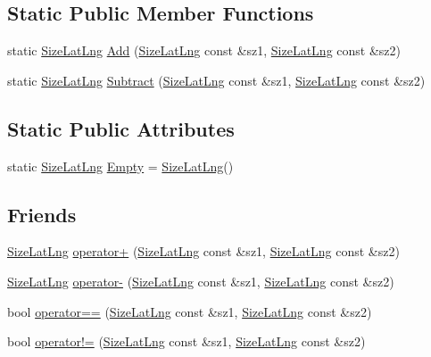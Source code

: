 \subsection*{\-Static \-Public \-Member \-Functions}
\begin{DoxyCompactItemize}
\item 
static \hyperlink{structinternals_1_1_size_lat_lng}{\-Size\-Lat\-Lng} \hyperlink{group___o_p_map_widget_gab3c5d8301e62629897221a2d5b2ba0b7}{\-Add} (\hyperlink{structinternals_1_1_size_lat_lng}{\-Size\-Lat\-Lng} const \&sz1, \hyperlink{structinternals_1_1_size_lat_lng}{\-Size\-Lat\-Lng} const \&sz2)
\item 
static \hyperlink{structinternals_1_1_size_lat_lng}{\-Size\-Lat\-Lng} \hyperlink{group___o_p_map_widget_ga6e437e3b3d5fd023b4afec09ad37928e}{\-Subtract} (\hyperlink{structinternals_1_1_size_lat_lng}{\-Size\-Lat\-Lng} const \&sz1, \hyperlink{structinternals_1_1_size_lat_lng}{\-Size\-Lat\-Lng} const \&sz2)
\end{DoxyCompactItemize}
\subsection*{\-Static \-Public \-Attributes}
\begin{DoxyCompactItemize}
\item 
static \hyperlink{structinternals_1_1_size_lat_lng}{\-Size\-Lat\-Lng} \hyperlink{group___o_p_map_widget_gad305f7cf650e7a5490bb77ccc65bbe08}{\-Empty} = \hyperlink{structinternals_1_1_size_lat_lng}{\-Size\-Lat\-Lng}()
\end{DoxyCompactItemize}
\subsection*{\-Friends}
\begin{DoxyCompactItemize}
\item 
\hyperlink{structinternals_1_1_size_lat_lng}{\-Size\-Lat\-Lng} \hyperlink{group___o_p_map_widget_ga398e0bae9b1c31e141e49ea14f960ad3}{operator+} (\hyperlink{structinternals_1_1_size_lat_lng}{\-Size\-Lat\-Lng} const \&sz1, \hyperlink{structinternals_1_1_size_lat_lng}{\-Size\-Lat\-Lng} const \&sz2)
\item 
\hyperlink{structinternals_1_1_size_lat_lng}{\-Size\-Lat\-Lng} \hyperlink{group___o_p_map_widget_ga5d0f63cfc6ce4e2c3249697e3156df5e}{operator-\/} (\hyperlink{structinternals_1_1_size_lat_lng}{\-Size\-Lat\-Lng} const \&sz1, \hyperlink{structinternals_1_1_size_lat_lng}{\-Size\-Lat\-Lng} const \&sz2)
\item 
bool \hyperlink{group___o_p_map_widget_gabb95545e93acc311be149febe7752b80}{operator==} (\hyperlink{structinternals_1_1_size_lat_lng}{\-Size\-Lat\-Lng} const \&sz1, \hyperlink{structinternals_1_1_size_lat_lng}{\-Size\-Lat\-Lng} const \&sz2)
\item 
bool \hyperlink{group___o_p_map_widget_ga1ee10c15dd9b86cfaf44a95b0bfd5bab}{operator!=} (\hyperlink{structinternals_1_1_size_lat_lng}{\-Size\-Lat\-Lng} const \&sz1, \hyperlink{structinternals_1_1_size_lat_lng}{\-Size\-Lat\-Lng} const \&sz2)
\end{DoxyCompactItemize}


